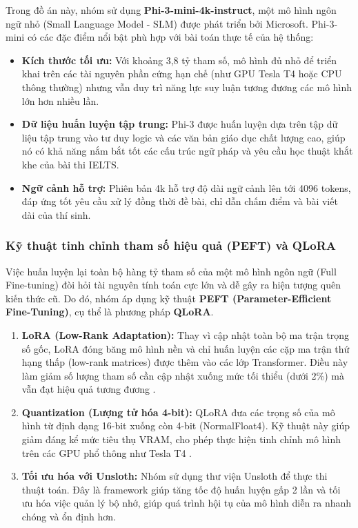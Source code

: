Trong đồ án này, nhóm sử dụng \textbf{Phi-3-mini-4k-instruct}, một mô hình ngôn ngữ nhỏ (Small Language Model - SLM) được phát triển bởi Microsoft. Phi-3-mini có các đặc điểm nổi bật phù hợp với bài toán thực tế của hệ thống:
\begin{itemize}
    \item \textbf{Kích thước tối ưu:} Với khoảng 3,8 tỷ tham số, mô hình đủ nhỏ để triển khai trên các tài nguyên phần cứng hạn chế (như GPU Tesla T4 hoặc CPU thông thường) nhưng vẫn duy trì năng lực suy luận tương đương các mô hình lớn hơn nhiều lần.
    \item \textbf{Dữ liệu huấn luyện tập trung:} Phi-3 được huấn luyện dựa trên tập dữ liệu tập trung vào tư duy logic và các văn bản giáo dục chất lượng cao, giúp nó có khả năng nắm bắt tốt các cấu trúc ngữ pháp và yêu cầu học thuật khắt khe của bài thi IELTS.
    \item \textbf{Ngữ cảnh hỗ trợ:} Phiên bản 4k hỗ trợ độ dài ngữ cảnh lên tới 4096 tokens, đáp ứng tốt yêu cầu xử lý đồng thời đề bài, chỉ dẫn chấm điểm và bài viết dài của thí sinh.
\end{itemize}

\subsubsection{Kỹ thuật tinh chỉnh tham số hiệu quả (PEFT) và QLoRA}
Việc huấn luyện lại toàn bộ hàng tỷ tham số của một mô hình ngôn ngữ (Full Fine-tuning) đòi hỏi tài nguyên tính toán cực lớn và dễ gây ra hiện tượng quên kiến thức cũ. Do đó, nhóm áp dụng kỹ thuật \textbf{PEFT (Parameter-Efficient Fine-Tuning)}, cụ thể là phương pháp \textbf{QLoRA}.

\begin{enumerate}
    \item \textbf{LoRA (Low-Rank Adaptation):} Thay vì cập nhật toàn bộ ma trận trọng số gốc, LoRA đóng băng mô hình nền và chỉ huấn luyện các cặp ma trận thứ hạng thấp (low-rank matrices) được thêm vào các lớp Transformer. Điều này làm giảm số lượng tham số cần cập nhật xuống mức tối thiểu (dưới 2\%) mà vẫn đạt hiệu quả tương đương \cite{lora_hu}.
    \item \textbf{Quantization (Lượng tử hóa 4-bit):} QLoRA đưa các trọng số của mô hình từ định dạng 16-bit xuống còn 4-bit (NormalFloat4). Kỹ thuật này giúp giảm đáng kể mức tiêu thụ VRAM, cho phép thực hiện tinh chỉnh mô hình trên các GPU phổ thông như Tesla T4 \cite{qlora}.
    \item \textbf{Tối ưu hóa với Unsloth:} Nhóm sử dụng thư viện Unsloth để thực thi thuật toán. Đây là framework giúp tăng tốc độ huấn luyện gấp 2 lần và tối ưu hóa việc quản lý bộ nhớ, giúp quá trình hội tụ của mô hình diễn ra nhanh chóng và ổn định hơn.
\end{enumerate}


